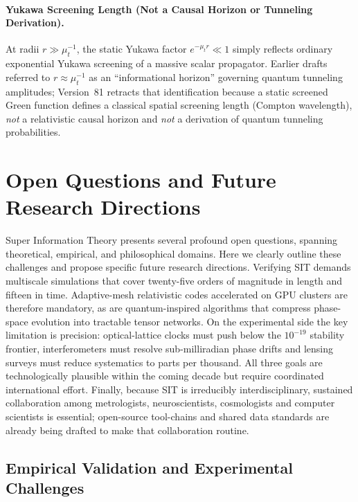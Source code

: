 \paragraph{Yukawa Screening Length (Not a Causal Horizon or Tunneling Derivation).}
At radii $r \gg \mu_t^{-1}$, the static Yukawa factor $e^{-\mu_t r} \ll 1$ simply reflects ordinary exponential Yukawa screening of a massive scalar propagator. Earlier drafts referred to $r \approx \mu_t^{-1}$ as an ``informational horizon'' governing quantum tunneling amplitudes; Version~81 retracts that identification because a static screened Green function defines a classical spatial screening length (Compton wavelength), \emph{not} a relativistic causal horizon and \emph{not} a derivation of quantum tunneling probabilities.

\section{Open Questions and Future Research Directions}
\label{sec:open-questions-future-directions}

Super Information Theory presents several profound open questions, spanning theoretical, empirical, and philosophical domains. Here we clearly outline these challenges and propose specific future research directions. Verifying SIT demands multiscale simulations that cover twenty-five orders of magnitude in length and fifteen in time.  Adaptive-mesh relativistic codes accelerated on GPU clusters are therefore mandatory, as are quantum-inspired algorithms that compress phase-space evolution into tractable tensor networks.  On the experimental side the key limitation is precision: optical-lattice clocks must push below the $10^{-19}$ stability frontier, interferometers must resolve sub-milliradian phase drifts and lensing surveys must reduce systematics to parts per thousand.  All three goals are technologically plausible within the coming decade but require coordinated international effort.  Finally, because SIT is irreducibly interdisciplinary, sustained collaboration among metrologists, neuroscientists, cosmologists and computer scientists is essential; open-source tool-chains and shared data standards are already being drafted to make that collaboration routine.

\subsection{Empirical Validation and Experimental Challenges}

